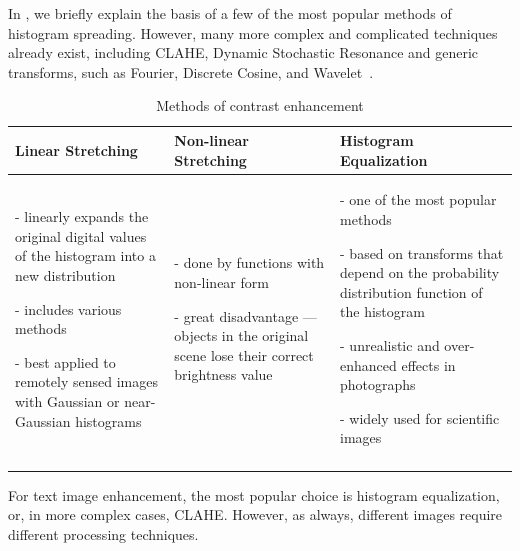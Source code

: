 In , we briefly explain the basis of a few of the most popular methods of histogram spreading. However, many more complex and complicated techniques already exist, including CLAHE, Dynamic Stochastic Resonance and generic transforms, such as Fourier, Discrete Cosine, and Wavelet~\cite{contrastOther}.

\begin{longtable}{p{10em}p{10em}p{10em}}
\textbf{Linear Stretching} & \textbf{Non-linear Stretching} & 
\textbf{Histogram Equalization}\\
\midrule

- linearly expands the original digital values of the histogram into a new distribution

- includes various methods \citep{linearNonStretch}

- best applied to remotely sensed images with Gaussian or near-Gaussian histograms

&

- done by functions with non-linear form \citep{linearNonStretch}

- great disadvantage --- objects in the original scene lose their correct brightness value

&

- one of the most popular methods \citep{histogramEQ}

- based on transforms that depend on the probability distribution function of the histogram

- unrealistic and over-enhanced effects in photographs

- widely used for scientific images
\\
\bottomrule
\caption{Methods of contrast enhancement}
\end{longtable}

For text image enhancement, the most popular choice is histogram equalization, or, in more complex cases, CLAHE. However, as always, different images require different processing techniques.

